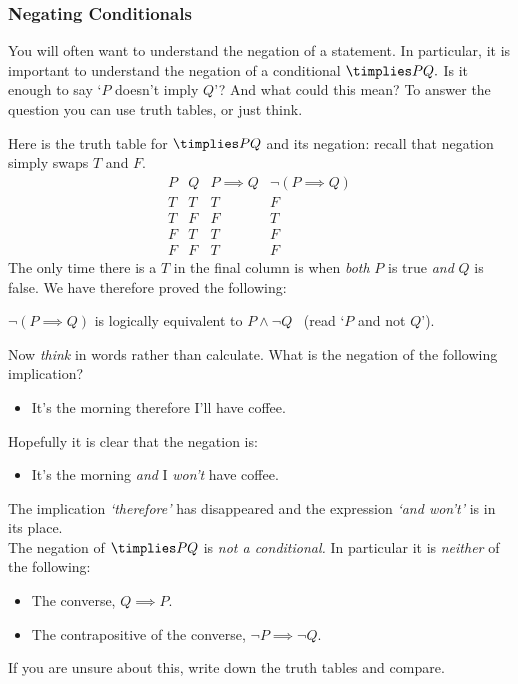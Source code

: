 \subsubsection*{Negating Conditionals}

You will often want to understand the negation of a statement. In particular, it is important to understand the negation of a conditional $\timplies P{Q.}$ Is it enough to say `$P$ doesn't imply $Q$'? And what could this mean? To answer the question you can use truth tables, or just think.

\noindent Here is the truth table for $\timplies PQ$ and its negation: recall that negation simply swaps $T$ and $F$.
\[\begin{array}{cc|c|c}
P & Q & P\implies Q & \neg(P\implies Q)\\\hline
T & T & T & F\\
T & F & F & T\\
F & T & T & F\\
F & F & T & F
\end{array}\]
The only time there is a $T$ in the final column is when \emph{both} $P$ is true \emph{and} $Q$ is false. We have therefore proved the following:

\begin{thm}\label{thm:negconditional}
$\neg(P\implies Q)$ is logically equivalent to $P\wedge\neg Q$ \ (read `$P$ and not $Q$').
\end{thm}

\noindent Now \emph{think} in words rather than calculate. What is the negation of the following implication?
\begin{itemize}\setlength{\itemsep}{0pt}
  \item[] It's the morning therefore I'll have coffee.
\end{itemize}
Hopefully it is clear that the negation is:
\begin{itemize}\setlength{\itemsep}{0pt}
  \item[] It's the morning \emph{and} I \emph{won't} have coffee.
\end{itemize}

\noindent The implication \emph{`therefore'} has disappeared and the expression \emph{`and won't'} is in its place.\\

 The negation of $\timplies PQ$ is \emph{not a conditional.} In particular it is \emph{neither} of the following:
\begin{itemize}\setlength{\itemsep}{0pt}
  \item[] The converse, $Q\implies P$.
  \item[] The contrapositive of the converse, $\neg P\implies\neg Q$. 
\end{itemize}
If you are unsure about this, write down the truth tables and compare.\goodbreak

